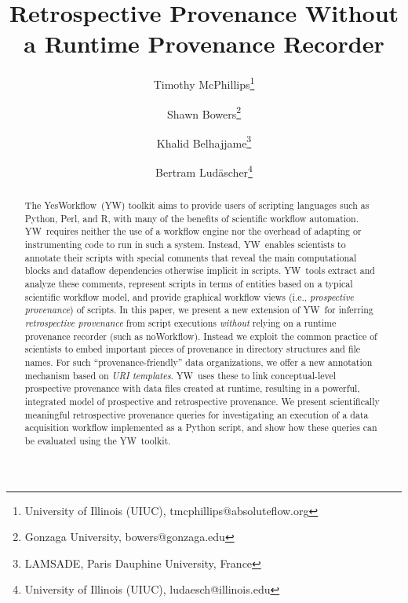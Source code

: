 \documentclass[letterpaper,twocolumn,10pt]{article}
\newcommand{\NW}{\textsf{noWorkflow}}
\newcommand{\YW}{\textsf{YesWorkflow}}
\newcommand{\yw}{\textsf{YW}}
\newcommand{\R}{\textsf{R}}
\newcommand{\MATLAB}{\textsf{MATLAB}}
\begin{document}
\newtheorem{mydef}{Definition}

\date{}

\title{Retrospective Provenance Without a Runtime Provenance Recorder}

\author{
Timothy McPhillips\thanks{University of Illinois (UIUC),
  tmcphillips@absoluteflow.org}
\and  
Shawn Bowers\thanks{Gonzaga University, bowers@gonzaga.edu}
\and
Khalid Belhajjame\thanks{LAMSADE, Paris Dauphine University, France}
\and 
Bertram Lud\"{a}scher\thanks{University of Illinois (UIUC), ludaesch@illinois.edu}
}

\maketitle

\thispagestyle{empty}

\begin{abstract}
  The \YW\ (\yw) toolkit aims to provide users of scripting languages
  such as Python, Perl, and \R, with many of the benefits of
  scientific workflow automation.  \yw\ requires neither the use of a
  workflow engine nor the overhead of adapting or instrumenting code
  to run %
  in such a system.  Instead, \yw\ enables scientists to annotate
  their scripts with special comments that reveal the main
  computational blocks and dataflow dependencies otherwise implicit in
  scripts.  \yw\ tools extract and analyze these comments, represent
  scripts in terms of entities based on a typical scientific workflow
  model, and provide graphical workflow views (i.e., \emph{prospective
    provenance}) of scripts.
  In this paper, we present a new extension of \yw\ for inferring
  \emph{retrospective provenance} from script executions
  \emph{without} relying on a runtime provenance recorder (such as
  \NW). Instead we exploit the common practice of scientists to embed
  important pieces of provenance in directory structures and file
  names. For such ``provenance-friendly'' data organizations, we offer
  a new annotation mechanism based on \emph{URI templates}. \yw\ uses
  these to link conceptual-level prospective provenance with data
  files created at runtime, resulting in a powerful, integrated model
  of prospective and retrospective provenance.
  We present scientifically meaningful retrospective provenance
  queries for investigating an execution of a data acquisition
  workflow implemented as a Python script, and show how these queries
  can be evaluated using the \yw\ toolkit.
\end{abstract}
\end{document}

